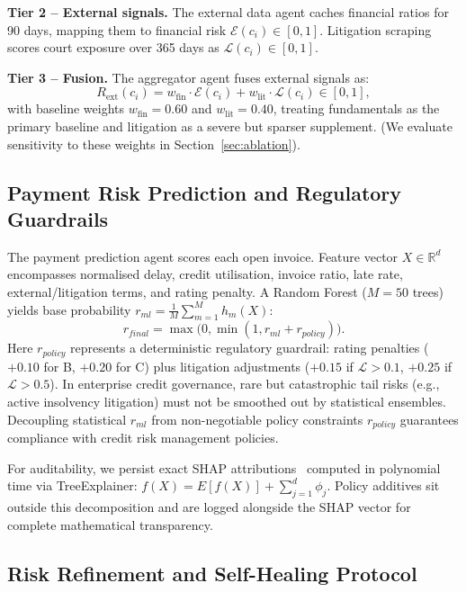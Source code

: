 \documentclass[conference]{IEEEtran}
\begin{document}
\textbf{Tier 2 -- External signals.} The external data agent caches financial ratios for 90 days, mapping them to financial risk $\mathcal{E}(c_i)\in[0,1]$. Litigation scraping scores court exposure over 365 days as $\mathcal{L}(c_i)\in[0,1]$.

\textbf{Tier 3 -- Fusion.} The aggregator agent fuses external signals as:
\begin{equation}
R_{\text{ext}}(c_i) = w_{\text{fin}}\cdot\mathcal{E}(c_i) + w_{\text{lit}}\cdot\mathcal{L}(c_i)\in[0,1],
\label{eq:aggregation}
\end{equation}
with baseline weights $w_{\text{fin}}=0.60$ and $w_{\text{lit}}=0.40$, treating fundamentals as the primary baseline and litigation as a severe but sparser supplement. (We evaluate sensitivity to these weights in Section~\ref{sec:ablation}).

\subsection{Payment Risk Prediction and Regulatory Guardrails}

The payment prediction agent scores each open invoice. Feature vector $X\in\mathbb{R}^{d}$ encompasses normalised delay, credit utilisation, invoice ratio, late rate, external/litigation terms, and rating penalty. A Random Forest ($M=50$ trees) yields base probability $r_{ml}=\frac{1}{M}\sum_{m=1}^{M} h_m(X)$:
\begin{equation}
r_{final}=\max\bigl(0,\min(1,r_{ml}+r_{policy})\bigr).
\label{eq:prediction}
\end{equation}
Here $r_{policy}$ represents a deterministic regulatory guardrail: rating penalties ($+0.10$ for B, $+0.20$ for C) plus litigation adjustments ($+0.15$ if $\mathcal{L}>0.1$, $+0.25$ if $\mathcal{L}>0.5$). In enterprise credit governance, rare but catastrophic tail risks (e.g., active insolvency litigation) must not be smoothed out by statistical ensembles. Decoupling statistical $r_{ml}$ from non-negotiable policy constraints $r_{policy}$ guarantees compliance with credit risk management policies.

For auditability, we persist exact SHAP attributions~\cite{lundberg2020local} computed in polynomial time via TreeExplainer: $f(X)=E[f(X)]+\sum_{j=1}^{d}\phi_j$. Policy additives sit outside this decomposition and are logged alongside the SHAP vector for complete mathematical transparency.

\subsection{Risk Refinement and Self-Healing Protocol}
\end{document}
